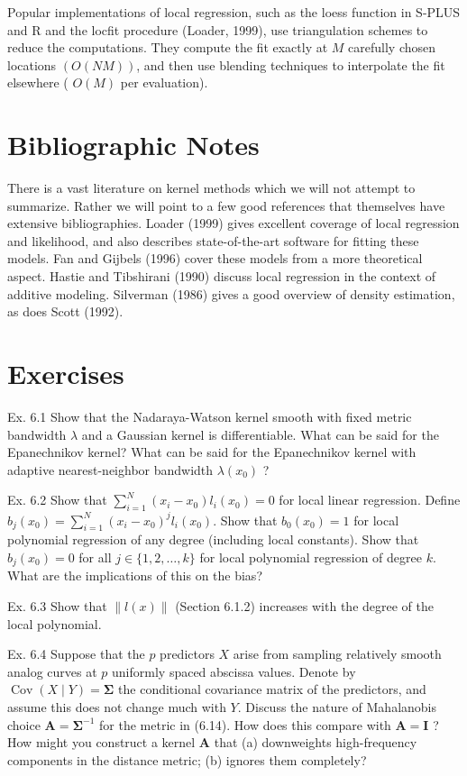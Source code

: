 \documentclass[10pt]{article}
\begin{document}
Popular implementations of local regression, such as the loess function in S-PLUS and R and the locfit procedure (Loader, 1999), use triangulation schemes to reduce the computations. They compute the fit exactly at $M$ carefully chosen locations $(O(N M))$, and then use blending techniques to interpolate the fit elsewhere ( $O(M)$ per evaluation).

\section*{Bibliographic Notes}
There is a vast literature on kernel methods which we will not attempt to summarize. Rather we will point to a few good references that themselves have extensive bibliographies. Loader (1999) gives excellent coverage of local regression and likelihood, and also describes state-of-the-art software for fitting these models. Fan and Gijbels (1996) cover these models from a more theoretical aspect. Hastie and Tibshirani (1990) discuss local regression in the context of additive modeling. Silverman (1986) gives a good overview of density estimation, as does Scott (1992).

\section*{Exercises}
Ex. 6.1 Show that the Nadaraya-Watson kernel smooth with fixed metric bandwidth $\lambda$ and a Gaussian kernel is differentiable. What can be said for the Epanechnikov kernel? What can be said for the Epanechnikov kernel with adaptive nearest-neighbor bandwidth $\lambda\left(x_{0}\right)$ ?

Ex. 6.2 Show that $\sum_{i=1}^{N}\left(x_{i}-x_{0}\right) l_{i}\left(x_{0}\right)=0$ for local linear regression. Define $b_{j}\left(x_{0}\right)=\sum_{i=1}^{N}\left(x_{i}-x_{0}\right)^{j} l_{i}\left(x_{0}\right)$. Show that $b_{0}\left(x_{0}\right)=1$ for local polynomial regression of any degree (including local constants). Show that $b_{j}\left(x_{0}\right)=0$ for all $j \in\{1,2, \ldots, k\}$ for local polynomial regression of degree $k$. What are the implications of this on the bias?

Ex. 6.3 Show that $\|l(x)\|$ (Section 6.1.2) increases with the degree of the local polynomial.

Ex. 6.4 Suppose that the $p$ predictors $X$ arise from sampling relatively smooth analog curves at $p$ uniformly spaced abscissa values. Denote by $\operatorname{Cov}(X \mid Y)=\boldsymbol{\Sigma}$ the conditional covariance matrix of the predictors, and assume this does not change much with $Y$. Discuss the nature of Mahalanobis choice $\mathbf{A}=\boldsymbol{\Sigma}^{-1}$ for the metric in (6.14). How does this compare with $\mathbf{A}=\mathbf{I}$ ? How might you construct a kernel $\mathbf{A}$ that (a) downweights high-frequency components in the distance metric; (b) ignores them completely?
\end{document}
